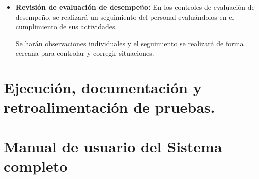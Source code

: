 \documentclass[a4paper,12pt]{article}
\begin{document}
\begin{itemize}




	    \item \textbf{Revisión de evaluación de desempeño:} En los controles de evaluación de desempeño, se realizará un seguimiento del personal evaluándolos en el cumplimiento de sus actividades.
        
        Se harán observaciones individuales y el seguimiento se realizará de forma cercana para controlar y corregir situaciones.
        

    \end{itemize}

\section{Ejecución, documentación y retroalimentación de pruebas.}

\section{Manual de usuario del Sistema completo} \label{manual_usuario}

\end{document}
